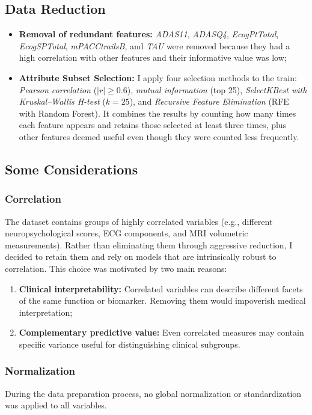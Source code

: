 \subsection{Data Reduction}
\begin{itemize}
	\item \textbf{Removal of redundant features:} \textit{ADAS11}, \textit{ADASQ4}, \textit{EcogPtTotal}, \textit{EcogSPTotal}, \textit{mPACCtrailsB}, and \textit{TAU} were removed because they had a high correlation with other features and their informative value was low;
	\item \textbf{Attribute Subset Selection:} I apply four selection methods to the train: \textit{Pearson correlation} ($|r| \ge 0.6$), \textit{mutual information} (top 25), \textit{SelectKBest with Kruskal–Wallis H-test} ($k=25$), and \textit{Recursive Feature Elimination} (RFE with Random Forest). It combines the results by counting how many times each feature appears and retains those selected at least three times, plus other features deemed useful even though they were counted less frequently.
\end{itemize}

\subsection{Some Considerations}
\subsubsection{Correlation}
The dataset contains groups of highly correlated variables (e.g., different neuropsychological scores, ECG components, and MRI volumetric measurements). Rather than eliminating them through aggressive reduction, I decided to retain them and rely on models that are intrinsically robust to correlation.
This choice was motivated by two main reasons:
\begin{enumerate}
	\item \textbf{Clinical interpretability:} Correlated variables can describe different facets of the same function or biomarker. Removing them would impoverish medical interpretation;
	\item \textbf{Complementary predictive value:} Even correlated measures may contain specific variance useful for distinguishing clinical subgroups.
\end{enumerate}

\subsubsection{Normalization}
During the data preparation process, no global normalization or standardization was applied to all variables. 

